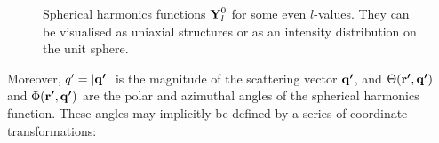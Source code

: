 \begin{figure}[h!]
    \centering
    \caption[Illustration of Spherical Harmonics]{Spherical harmonics functions $\bm{\mathrm{Y}}_{l}^{0}$ for some even $l$-values.
        They can be visualised as uniaxial structures or as an intensity distribution on the unit sphere.
    }
    \label{fig:spherical_harmonics}
\end{figure}


Moreover, $q' = |\bm{\mathrm{q'}}|$ is the magnitude of the scattering vector $\bm{\mathrm{q'}}$, and $\Theta(\bm{\mathrm{r'}}, \bm{\mathrm{q'}})$ and $\Phi(\bm{\mathrm{r'}}, \bm{\mathrm{q'}})$ are the polar and azimuthal angles of the spherical harmonics function.
These angles may implicitly be defined by a series of coordinate transformations:

